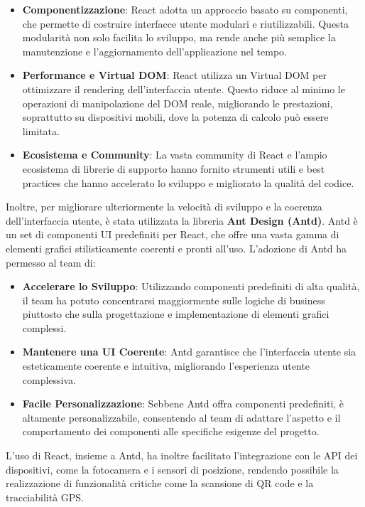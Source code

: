\documentclass[twoside]{supsistudent}
\begin{document}
\begin{itemize}
  \item \textbf{Componentizzazione}: React adotta un approccio basato su componenti, che permette di costruire interfacce utente modulari e riutilizzabili. Questa modularità non solo facilita lo sviluppo, ma rende anche più semplice la manutenzione e l'aggiornamento dell'applicazione nel tempo.
  \item \textbf{Performance e Virtual DOM}: React utilizza un Virtual DOM per ottimizzare il rendering dell'interfaccia utente. Questo riduce al minimo le operazioni di manipolazione del DOM reale, migliorando le prestazioni, soprattutto su dispositivi mobili, dove la potenza di calcolo può essere limitata.
  \item \textbf{Ecosistema e Community}: La vasta community di React e l'ampio ecosistema di librerie di supporto hanno fornito strumenti utili e best practices che hanno accelerato lo sviluppo e migliorato la qualità del codice.
\end{itemize}

Inoltre, per migliorare ulteriormente la velocità di sviluppo e la coerenza dell'interfaccia utente, è stata utilizzata la libreria \textbf{Ant Design (Antd)}. Antd è un set di componenti UI predefiniti per React, che offre una vasta gamma di elementi grafici stilisticamente coerenti e pronti all'uso. L'adozione di Antd ha permesso al team di:

\begin{itemize}
  \item \textbf{Accelerare lo Sviluppo}: Utilizzando componenti predefiniti di alta qualità, il team ha potuto concentrarsi maggiormente sulle logiche di business piuttosto che sulla progettazione e implementazione di elementi grafici complessi.
  \item \textbf{Mantenere una UI Coerente}: Antd garantisce che l'interfaccia utente sia esteticamente coerente e intuitiva, migliorando l'esperienza utente complessiva.
  \item \textbf{Facile Personalizzazione}: Sebbene Antd offra componenti predefiniti, è altamente personalizzabile, consentendo al team di adattare l'aspetto e il comportamento dei componenti alle specifiche esigenze del progetto.
\end{itemize}

L'uso di React, insieme a Antd, ha inoltre facilitato l'integrazione con le API dei dispositivi, come la fotocamera e i sensori di posizione, rendendo possibile la realizzazione di funzionalità critiche come la scansione di QR code e la tracciabilità GPS.
\end{document}
